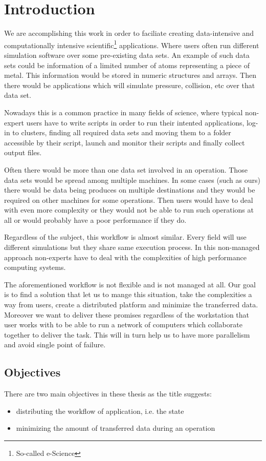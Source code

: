 \chapter{Introduction}
\label{cha:introduction}

We are accomplishing this work in order to faciliate creating data-intensive and computationally intensive 
scientific\footnote{So-called e-Science} applications.
Where users often run different simulation software over some pre-existing data sets.
An example of such data sets could be information of a limited number of atoms representing a piece of metal. 
This information would be stored in numeric structures and arrays.
Then there would be applications which will simulate pressure, collision, etc over that data set.

Nowadays this is a common practice in many fields of science, 
where typical non-expert users have to write scripts in order to run their intented applications,
log-in to clusters, finding all required data sets and moving them to a folder
accessible by their script, launch and monitor their scripts and finally collect output files.

Often there would be more than one data set involved in an operation. 
Those data sets would be spread among multiple machines. 
In some cases (such as ours) there would be data being produces on multiple destinations and
they would be required on other machines for some operations.
Then users would have to deal with even more complexity or they would not be able to run
such operations at all or would probably have a poor performance if they do.

Regardless of the subject, this workflow is almost similar. 
Every field will use different simulations but they share same execution process.
In this non-managed approach non-experts have to deal with the complexities of high performance computing systems.

The aforementioned workflow is not flexible and is not managed at all. 
Our goal is to find a solution that let us to mange this situation, 
take the complexities a way from users, create a distributed platform and minimize the transferred data.
Moreover we want to deliver these promises regardless of the workstation that user works with to be
able to run a network of computers which collaborate together to deliver the task. 
This will in turn help us to have more parallelism and avoid single point of failure.

\section{Objectives}
There are two main objectives in these thesis as the title suggests:
\begin{itemize}
\item distributing the workflow of application, i.e. the state
\item minimizing the amount of transferred data during an operation
\end{itemize}

